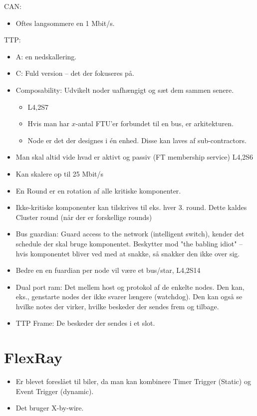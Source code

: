 \documentclass[oneside, 10pt]{article}
\begin{document}
CAN:
\begin{itemize}
	\item Oftes langsommere en 1 Mbit/s.
\end{itemize}

TTP:
\begin{itemize}
	\item A: en nedskallering.
	\item C: Fuld version -- det der fokuseres på.
	\item Composability: Udvikelt noder uafhængigt og sæt dem sammen senere.
	\begin{itemize}
		\item L4,2S7
		\item Hvis man har $x$-antal FTU'er forbundet til en bus, er arkitekturen.
		\item Node er det der designes i én enhed. Disse kan laves af sub-contractors.
	\end{itemize}
	\item Man skal altid vide hvad er aktivt og passiv (FT membership service) L4,2S6
	\item Kan skalere op til 25 Mbit/s
	\item En Round er en rotation af alle kritiske komponenter.
	\item Ikke-kritiske komponenter kan tilskrives til eks. hver 3. round. Dette kaldes Cluster round (når der er forskellige rounds)
	\item Bus guardian: Guard access to the network (intelligent switch), kender det schedule der skal bruge komponentet. Beskytter mod "the babling idiot" -- hvis komponentet bliver ved med at snakke, så snakker den ikke over sig.
	\item Bedre en en fuardian per node vil være et bus/star, L4,2S14

	\item Dual port ram: Det mellem host og protokol af de enkelte nodes. Den kan, eks., genstarte nodes der ikke svarer længere (watchdog). Den kan også se hvilke notes der virker, hvilke beskeder der sendes frem og tilbage.
	\item TTP Frame: De beskeder der sendes i et slot.
\end{itemize}



\newpage
\section{FlexRay}

\begin{itemize}
	\item Er blevet foreslået til biler, da man kan kombinere Timer Trigger (Static) og Event Trigger (dynamic).
	\item Det bruger X-by-wire.
\end{itemize}
\end{document}
